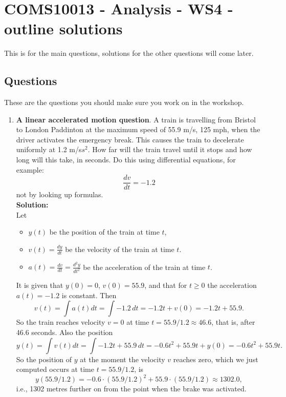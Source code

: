 \documentclass[11pt,a4paper]{scrartcl}
\begin{document}
\section*{COMS10013 - Analysis - WS4 - outline solutions}

This is for the main questions, solutions for the other questions will come later.
  
\subsection*{Questions}

These are the questions you should make sure you work on in the workshop.

\begin{enumerate}

\item \textbf{A linear accelerated motion question}. A train is travelling from Bristol to London Paddinton at the maximum speed of 55.9 m/s, 125 mph, when the driver activates the emergency break. This causes the train to decelerate uniformly at 1.2 m/s$s^2$. How far will the train travel until it stops and how long will this take, in seconds. Do this using differential equations, for example:
  \begin{equation}
    \frac{dv}{dt}=-1.2
  \end{equation}
  not by looking up formulas.
	\\
	\textbf{Solution:}
	\\
	Let 
	\begin{itemize}
		\item $y(t)$ be the position of the train at time $t$,
		\item $v(t) = \frac{dy}{dt}$ be the velocity of the train at time $t$.
		\item $a(t) = \frac{dv}{dt} = \frac{d^2y}{dt^2}$ be the acceleration of the train at time $t$.
	\end{itemize}
	It is given that $y(0) = 0$, $v(0) = 55.9$, and that for $t\geq 0$ the acceleration $a(t) = -1.2$ is constant.
	Then 
	$$v(t) = \int a(t) dt = \int -1.2 \, dt = -1.2t + v(0) = -1.2t + 55.9.$$
	So the train reaches velocity $v = 0$ at time $t = 55.9/1.2 \approx 46.6$,
	that is, after 46.6 seconds.
	Also the position
	$$y(t) = \int v(t) dt = \int -1.2t + 55.9 \, dt = 
	-0.6 t^2 + 55.9 t + y(0) = -0.6 t^2 + 55.9 t.$$
	So the position of $y$ at the moment the velocity $v$ reaches zero,
	which we just computed occurs at time $t = 55.9/1.2$, is
	$$y(55.9/1.2) = -0.6 \cdot (55.9/1.2)^2 + 55.9 \cdot (55.9/1.2) \approx 1302.0,$$
	i.e., 1302 metres further on from the point when the brake was activated.



\end{enumerate}
\end{document}

